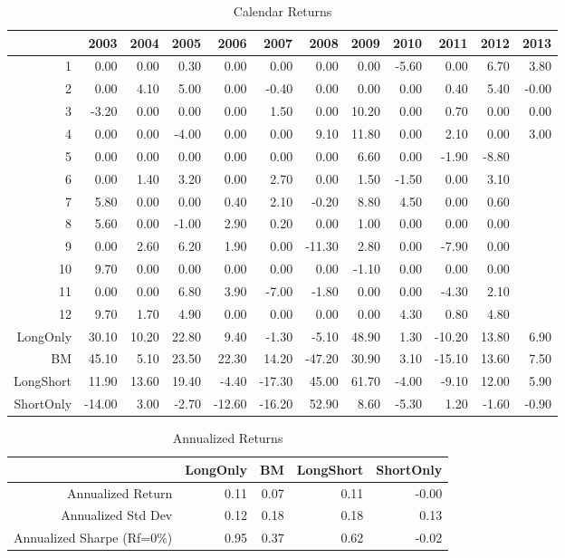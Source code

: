 \documentclass{article}
\begin{document}
\begin{table}[ht]
\centering
\caption{Calendar Returns} 
\begin{tabular}{rrrrrrrrrrrr}
  \hline
 & 2003 & 2004 & 2005 & 2006 & 2007 & 2008 & 2009 & 2010 & 2011 & 2012 & 2013 \\ 
  \hline
1 & 0.00 & 0.00 & 0.30 & 0.00 & 0.00 & 0.00 & 0.00 & -5.60 & 0.00 & 6.70 & 3.80 \\ 
  2 & 0.00 & 4.10 & 5.00 & 0.00 & -0.40 & 0.00 & 0.00 & 0.00 & 0.40 & 5.40 & -0.00 \\ 
  3 & -3.20 & 0.00 & 0.00 & 0.00 & 1.50 & 0.00 & 10.20 & 0.00 & 0.70 & 0.00 & 0.00 \\ 
  4 & 0.00 & 0.00 & -4.00 & 0.00 & 0.00 & 9.10 & 11.80 & 0.00 & 2.10 & 0.00 & 3.00 \\ 
  5 & 0.00 & 0.00 & 0.00 & 0.00 & 0.00 & 0.00 & 6.60 & 0.00 & -1.90 & -8.80 &  \\ 
  6 & 0.00 & 1.40 & 3.20 & 0.00 & 2.70 & 0.00 & 1.50 & -1.50 & 0.00 & 3.10 &  \\ 
  7 & 5.80 & 0.00 & 0.00 & 0.40 & 2.10 & -0.20 & 8.80 & 4.50 & 0.00 & 0.60 &  \\ 
  8 & 5.60 & 0.00 & -1.00 & 2.90 & 0.20 & 0.00 & 1.00 & 0.00 & 0.00 & 0.00 &  \\ 
  9 & 0.00 & 2.60 & 6.20 & 1.90 & 0.00 & -11.30 & 2.80 & 0.00 & -7.90 & 0.00 &  \\ 
  10 & 9.70 & 0.00 & 0.00 & 0.00 & 0.00 & 0.00 & -1.10 & 0.00 & 0.00 & 0.00 &  \\ 
  11 & 0.00 & 0.00 & 6.80 & 3.90 & -7.00 & -1.80 & 0.00 & 0.00 & -4.30 & 2.10 &  \\ 
  12 & 9.70 & 1.70 & 4.90 & 0.00 & 0.00 & 0.00 & 0.00 & 4.30 & 0.80 & 4.80 &  \\ 
  LongOnly & 30.10 & 10.20 & 22.80 & 9.40 & -1.30 & -5.10 & 48.90 & 1.30 & -10.20 & 13.80 & 6.90 \\ 
  BM & 45.10 & 5.10 & 23.50 & 22.30 & 14.20 & -47.20 & 30.90 & 3.10 & -15.10 & 13.60 & 7.50 \\ 
  LongShort & 11.90 & 13.60 & 19.40 & -4.40 & -17.30 & 45.00 & 61.70 & -4.00 & -9.10 & 12.00 & 5.90 \\ 
  ShortOnly & -14.00 & 3.00 & -2.70 & -12.60 & -16.20 & 52.90 & 8.60 & -5.30 & 1.20 & -1.60 & -0.90 \\ 
   \hline
\end{tabular}
\end{table}%
\begin{table}[ht]
\centering
\caption{Annualized Returns} 
\begin{tabular}{rrrrr}
  \hline
 & LongOnly & BM & LongShort & ShortOnly \\ 
  \hline
Annualized Return & 0.11 & 0.07 & 0.11 & -0.00 \\ 
  Annualized Std Dev & 0.12 & 0.18 & 0.18 & 0.13 \\ 
  Annualized Sharpe (Rf=0\%) & 0.95 & 0.37 & 0.62 & -0.02 \\ 
   \hline
\end{tabular}
\end{table}%
\end{document}
